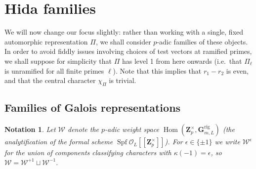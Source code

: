 \documentclass[cjm]{ipart}
\theoremstyle{plain}
\newtheorem{notation}[theorem]{Notation}
\theoremstyle{remark}
\DeclareMathOperator{\Hom}{Hom}
\newcommand{\Zp}{\mathbf{Z}_p}
\newcommand{\cO}{\mathcal{O}}
\newcommand{\cW}{\mathcal{W}}
\numberwithin{equation}{subsection}
\begin{document}



\section{Hida families}
 \label{sect:families}

 We will now change our focus slightly: rather than working with a single, fixed automorphic representation $\Pi$, we shall consider $p$-adic families of these objects. In order to avoid fiddly issues involving choices of test vectors at ramified primes, we shall suppose for simplicity that $\Pi$ has level 1 from here onwards (i.e.~that $\Pi_\ell$ is unramified for all finite primes $\ell$). Note that this implies that $r_1 - r_2$ is even, and that the central character $\chi_{\Pi}$ is trivial.

 \subsection{Families of Galois representations}

  \begin{notation}
   Let $\cW$ denote the $p$-adic weight space $\Hom(\Zp^\times, \mathbf{G}_{m, L}^{\mathrm{rig}})$ (the analytification of the formal scheme $\operatorname{Spf} \cO_L[[\Zp^\times]]$). For $\epsilon \in \{ \pm 1\}$ we write $\cW^\epsilon$ for the union of components classifying characters with $\kappa(-1) = \epsilon$, so $\cW = \cW^{+1} \sqcup \cW^{-1}$.
  \end{notation}
\end{document}
